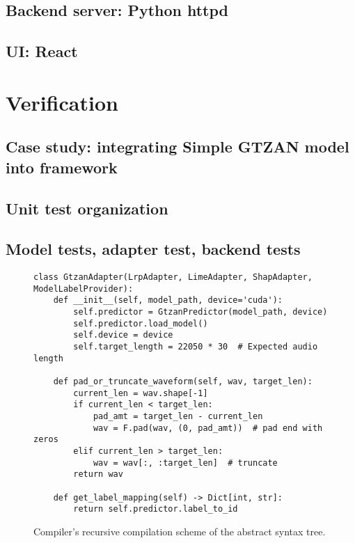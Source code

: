 \documentclass[
    bindingoffset=5mm,  %
    footnoteindent=3mm, %
    hyphenation=true    %
]{src/wut-thesis}
\begin{document}
\subsection{Backend server: Python httpd}
\subsection{UI: React}

%
%
\clearpage %
\section{Verification} \label{ch:verification}

\subsection{Case study: integrating Simple GTZAN model into framework}
\subsection{Unit test organization}
\subsection{Model tests, adapter test, backend tests}

\begin{figure}%
\begin{verbatim}
class GtzanAdapter(LrpAdapter, LimeAdapter, ShapAdapter, ModelLabelProvider):
    def __init__(self, model_path, device='cuda'):
        self.predictor = GtzanPredictor(model_path, device)
        self.predictor.load_model()
        self.device = device
        self.target_length = 22050 * 30  # Expected audio length

    def pad_or_truncate_waveform(self, wav, target_len):
        current_len = wav.shape[-1]
        if current_len < target_len:
            pad_amt = target_len - current_len
            wav = F.pad(wav, (0, pad_amt))  # pad end with zeros
        elif current_len > target_len:
            wav = wav[:, :target_len]  # truncate
        return wav
    
    def get_label_mapping(self) -> Dict[int, str]:
        return self.predictor.label_to_id
\end{verbatim}
\caption{Compiler's recursive compilation scheme of the abstract syntax tree.}
\label{fig:RecursiveCompilation}
\end{figure}
\end{document}
